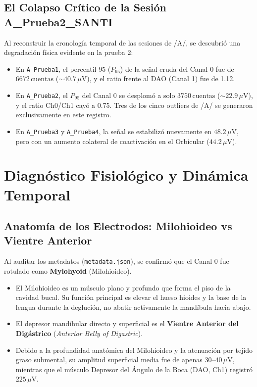 \documentclass[11pt,a4paper]{article}
\begin{document}
\subsection{El Colapso Crítico de la Sesión A\_Prueba2\_SANTI}
Al reconstruir la cronología temporal de las sesiones de /A/, se descubrió una degradación física evidente en la prueba 2:
\begin{itemize}
    \item En \texttt{A\_Prueba1}, el percentil 95 ($P_{95}$) de la señal cruda del Canal 0 fue de $6672\,\text{cuentas}$ ($\sim 40.7\,\mu\text{V}$), y el ratio frente al DAO (Canal 1) fue de 1.12.
    \item En \texttt{A\_Prueba2}, el $P_{95}$ del Canal 0 se desplomó a solo $3750\,\text{cuentas}$ ($\sim 22.9\,\mu\text{V}$), y el ratio Ch0/Ch1 cayó a 0.75. Tres de los cinco outliers de /A/ se generaron exclusivamente en este registro.
    \item En \texttt{A\_Prueba3} y \texttt{A\_Prueba4}, la señal se estabilizó nuevamente en $48.2\,\mu\text{V}$, pero con un aumento colateral de coactivación en el Orbicular ($44.2\,\mu\text{V}$).
\end{itemize}

\section{Diagnóstico Fisiológico y Dinámica Temporal}

\subsection{Anatomía de los Electrodos: Milohioideo vs Vientre Anterior}
Al auditar los metadatos (\texttt{metadata.json}), se confirmó que el Canal 0 fue rotulado como \textbf{Mylohyoid} (Milohioideo).
\begin{itemize}
    \item El Milohioideo es un músculo plano y profundo que forma el piso de la cavidad bucal. Su función principal es elevar el hueso hioides y la base de la lengua durante la deglución, no abatir activamente la mandíbula hacia abajo.
    \item El depresor mandibular directo y superficial es el \textbf{Vientre Anterior del Digástrico} (\textit{Anterior Belly of Digastric}).
    \item Debido a la profundidad anatómica del Milohioideo y la atenuación por tejido graso submental, su amplitud superficial media fue de apenas $30\text{--}40\,\mu\text{V}$, mientras que el músculo Depresor del Ángulo de la Boca (DAO, Ch1) registró $225\,\mu\text{V}$.
\end{itemize}
\end{document}
